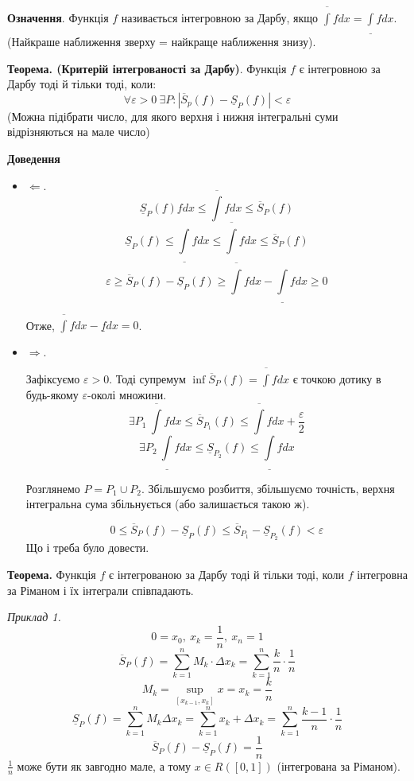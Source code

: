 \documentclass[12pt]{report}
\begin{document}
\textbf{Означення}. Функція $f$ називається інтегровною за Дарбу, якщо $\overline \int f dx = \underline \int fdx$. (Найкраше наближення зверху = найкраще наближення знизу).

\textbf{Теорема. (Критерій інтегрованості за Дарбу)}. Функція $f$ є інтегровною за Дарбу тоді й тільки тоді, коли:
$$\forall \varepsilon > 0 \ \exists P : |\overline S_{p}(f) - \underline S_{P} (f)| < \varepsilon$$
(Можна підібрати число, для якого верхня і нижня інтегральні суми відрізняються на мале число)

\textbf{Доведення}

\begin{itemize}
\item $\Longleftarrow.$
$$\underline S_{P} (f) fdx \leq \overline \int fdx \leq \overline S_{P} (f)$$ 
$$\underline S_{P} (f) \leq \underline \int fdx \leq \overline \int f dx \leq \overline S_{P} (f)$$
$$\varepsilon \geq \overline S_{P} (f) - \underline S_{P} (f) \geq \overline \int f dx - \underline \int f dx \geq 0$$

Отже, $\overline \int f dx - \underline f dx = 0$.

\item $\Longrightarrow.$

Зафіксуємо $\varepsilon > 0$. Тоді супремум $\inf \overline S_{P} (f) = \overline \int f dx$ є точкою дотику 
в будь-якому $\varepsilon$-околі множини.
$$\exists P_{1} \ \overline \int f dx \leq \overline S_{P_1} (f) \leq \overline \int fdx + \frac{\varepsilon}{2}$$
$$\exists P_{2} \ \underline \int f dx \leq \underline S_{P_2} (f) \leq \underline \int fdx $$

Розглянемо $P = P_1 \cup P_2$. Збільшуємо розбиття, збільшуємо точність, верхня інтегральна сума збільнується (або залишається такою ж).

$$0 \leq \overline S_{P} (f) - \underline S_{P} (f) \leq \overline S_{P_1} - \underline S_{P_2} (f) < \varepsilon$$
Що і треба було довести.
\end{itemize}

\vspace{5mm}

\textbf{Теорема.} Функція $f$ є інтегрованою за Дарбу тоді й тільки тоді, коли $f$ інтегровна за Ріманом і їх інтеграли співпадають.

\vspace{3mm}

\textit{Приклад 1.}
$$0 = x_0,\ x_k = \frac{1}{n},\ x_n = 1$$
$$\overline S_{P} (f) = \sum_{k=1}^n M_k \cdot \Delta x_k = \sum_{k=1}^n \frac{k}{n} \cdot \frac{1}{n}$$
$$M_k = \sup_{[x_{k-1}, x_k]} x = x_k = \frac{k}{n}$$
$$\underline S_{P} (f) = \sum_{k = 1}^n M_k \Delta x_k = \sum_{k=1}^n x_k + \Delta x_k = \sum_{k=1}^{n} \frac{k-1}{n} \cdot \frac{1}{n}$$
$$\overline S_{P}(f) - \underline S_{P} (f) = \frac{1}{n}$$
$\frac{1}{n}$ може бути як завгодно мале, а тому $x \in R([0,1])$ (інтегрована за Ріманом).
\vspace{3mm}
\end{document}
